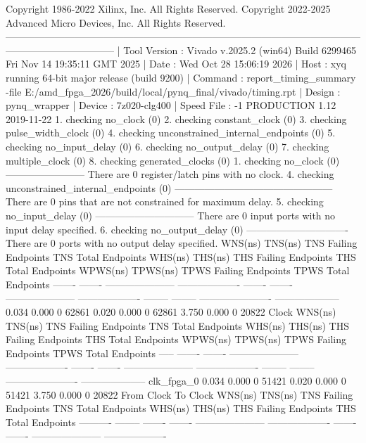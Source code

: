\begin{codeblock}
Copyright 1986-2022 Xilinx, Inc. All Rights Reserved. Copyright 2022-2025 Advanced Micro Devices, Inc. All Rights Reserved.
---------------------------------------------------------------------------------------------------------------------------------------------
| Tool Version : Vivado v.2025.2 (win64) Build 6299465 Fri Nov 14 19:35:11 GMT 2025
| Date         : Wed Oct 28 15:06:19 2026
| Host         : xyq running 64-bit major release  (build 9200)
| Command      : report_timing_summary -file E:/amd_fpga_2026/build/local/pynq_final/vivado/timing.rpt
| Design       : pynq_wrapper
| Device       : 7z020-clg400
| Speed File   : -1  PRODUCTION 1.12 2019-11-22
1. checking no_clock (0)
2. checking constant_clock (0)
3. checking pulse_width_clock (0)
4. checking unconstrained_internal_endpoints (0)
5. checking no_input_delay (0)
6. checking no_output_delay (0)
7. checking multiple_clock (0)
8. checking generated_clocks (0)
1. checking no_clock (0)
------------------------
 There are 0 register/latch pins with no clock.
4. checking unconstrained_internal_endpoints (0)
------------------------------------------------
 There are 0 pins that are not constrained for maximum delay.
5. checking no_input_delay (0)
------------------------------
 There are 0 input ports with no input delay specified.
6. checking no_output_delay (0)
-------------------------------
 There are 0 ports with no output delay specified.
    WNS(ns)      TNS(ns)  TNS Failing Endpoints  TNS Total Endpoints      WHS(ns)      THS(ns)  THS Failing Endpoints  THS Total Endpoints     WPWS(ns)     TPWS(ns)  TPWS Failing Endpoints  TPWS Total Endpoints  
    -------      -------  ---------------------  -------------------      -------      -------  ---------------------  -------------------     --------     --------  ----------------------  --------------------  
      0.034        0.000                      0                62861        0.020        0.000                      0                62861        3.750        0.000                       0                 20822  
Clock             WNS(ns)      TNS(ns)  TNS Failing Endpoints  TNS Total Endpoints      WHS(ns)      THS(ns)  THS Failing Endpoints  THS Total Endpoints     WPWS(ns)     TPWS(ns)  TPWS Failing Endpoints  TPWS Total Endpoints  
-----             -------      -------  ---------------------  -------------------      -------      -------  ---------------------  -------------------     --------     --------  ----------------------  --------------------  
clk_fpga_0          0.034        0.000                      0                51421        0.020        0.000                      0                51421        3.750        0.000                       0                 20822  
From Clock    To Clock          WNS(ns)      TNS(ns)  TNS Failing Endpoints  TNS Total Endpoints      WHS(ns)      THS(ns)  THS Failing Endpoints  THS Total Endpoints  
----------    --------          -------      -------  ---------------------  -------------------      -------      -------  ---------------------  -------------------  


\end{codeblock}
